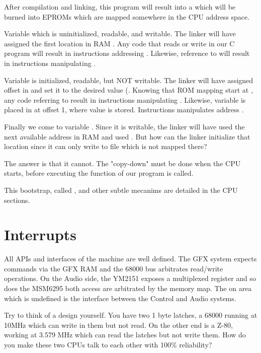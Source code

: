 After compilation and linking, this program will result into a  which will be burned into EPROMs which are mapped somewhere in the CPU address space.


Variable  which is uninitialized, readable, and writable. The linker will have assigned the first location in RAM . Any code that reads or write  in our C program will result in instructions addressing . Likewise, reference to  will result in instructions manipulating .

Variable   is initialized, readable, but NOT writable. The linker will have assigned offset  in  and set it to the desired value (. Knowing that ROM mapping start at , any code referring to  result in instructions manipulating . Likewise, variable  is placed in  at offset 1, where value  is stored. Instructions manipulates address .

Finally we come to variable . Since it is writable, the linker will have used the next available address in RAM and used . But how can the linker initialize that location since it can only write to file  which is not mapped there? 

The answer is that it cannot. The "copy-down" must be done when the CPU starts, before executing the  function of our program is called. 

This bootstrap, called , and other subtle mecanims are detailed in the CPU sections.


\section{Interrupts}

All APIs and interfaces of the machine are well defined. The GFX system expects commands via the GFX RAM and the 68000 bus arbitrates read/write operations. On the Audio side, the YM2151 exposes a multiplexed register and so does the MSM6295 both access are arbitrated by the memory map. The on area which is undefined is the interface between the Control and Audio systems.

Try to think of a design yourself. You have two 1 byte latches, a 68000 running at 10MHz which can write in them but not read. On the other end is a Z-80, working at 3.579 MHz which can read the latches but not write them. How do you make these two CPUs talk to each other with 100\% reliability?


